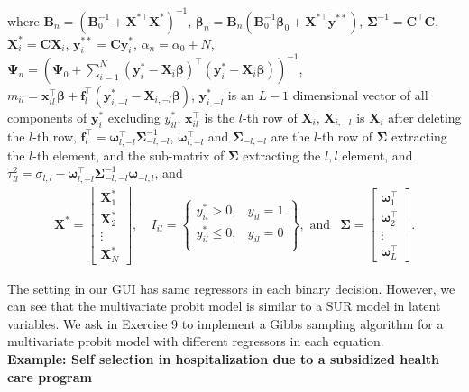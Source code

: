 where $\bm{B}_n=(\bm{B}_0^{-1}+\bm{X}^{*\top}\bm{X}^*)^{-1}$, $\bm{\beta}_n=\bm{B}_n(\bm{B}_0^{-1}\bm{\beta}_0+\bm{X}^{*\top}\bm{y}^{**})$, $\bm{\Sigma}^{-1}=\bm{C}^{\top}\bm{C}$, $\bm{X}_i^{*}=\bm{C}\bm{X}_i$, $\bm{y}_i^{**}=\bm{C}\bm{y}_i^*$, $\alpha_n=\alpha_0+N$, $\bm{\Psi}_n=(\bm{\Psi}_0+\sum_{i=1}^N (\bm{y}_i^*-\bm{X}_i\bm{\beta})^{\top}(\bm{y}_i^*-\bm{X}_i\bm{\beta}))^{-1}$,  $m_{il}=\bm{x}_{il}^{\top}\bm{\beta}+\bm{f}_l^{\top}(\bm{y}_{i,-l}^*-\bm{X}_{i,-l}\bm{\beta})$, $\bm{y}_{i,-l}^*$ is an $L-1$ dimensional vector of all components of $\bm{y}_i^*$ excluding $y_{il}^*$, $\bm{x}_{il}^{\top}$ is the $l$-th row of $\bm{X}_i$, $\bm{X}_{i,-l}$ is $\bm{X}_{i}$ after deleting the $l$-th row, $\bm{f}_l^{\top}=\bm{\omega}_{l,-l}^{\top}\bm{\Sigma}_{-l,-l}^{-1}$, $\bm{\omega}_{l,-l}^{\top}$ and $\bm{\Sigma}_{-l,-l}$ are the $l$-th row of $\bm{\Sigma}$ extracting the $l$-th element, and the sub-matrix of $\bm{\Sigma}$ extracting the $l,l$ element, and $\tau_{ll}^2=\sigma_{l,l}-\bm{\omega}_{l,-l}^{\top}\bm{\Sigma}_{-l,-l}^{-1}\bm{\omega}_{-l,l}$, and 
\begin{align*}
	\bm{X}^*=\begin{bmatrix}\bm{X}_1^*\\
		\bm{X}_2^*\\
		\vdots\\
		\bm{X}_N^*
	\end{bmatrix}, & \ I_{il}=\begin{Bmatrix} y_{il}^*> 0, & y_{il}=1\\
	y_{il}^*\leq 0 , & y_{il}=0\\
\end{Bmatrix},\text{ and}&\bm{\Sigma}=\begin{bmatrix}\bm{\omega}_1^{\top} \\ \bm{\omega}_2^{\top} \\ \vdots \\ \bm{\omega}_{L}^{\top} \end{bmatrix}.
\end{align*}

The setting in our GUI has same regressors in each binary decision. However, we can see that the multivariate probit model is similar to a SUR model in latent variables. We ask in Exercise 9 to implement a Gibbs sampling algorithm for a multivariate probit model with different regressors in each equation.\\

\textbf{Example: Self selection in hospitalization due to a subsidized health care program}

